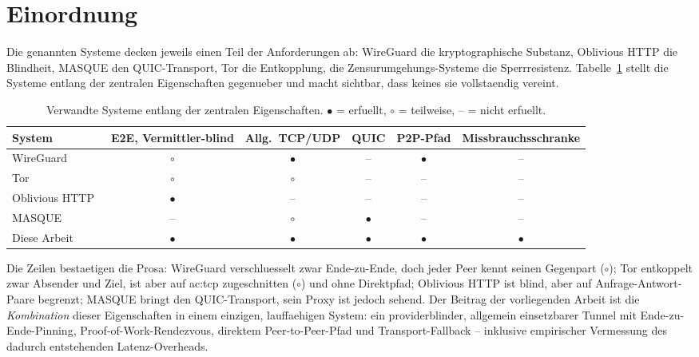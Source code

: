 \section{Einordnung}
\label{sec:rw-einordnung}

Die genannten Systeme decken jeweils einen Teil der Anforderungen ab:
WireGuard die kryptographische Substanz, Oblivious HTTP die Blindheit, MASQUE den
QUIC-Transport, Tor die Entkopplung, die Zensurumgehungs-Systeme die
Sperrresistenz. Tabelle~\ref{tab:rw-vergleich} stellt die Systeme entlang der
zentralen Eigenschaften gegenueber und macht sichtbar, dass keines sie
vollstaendig vereint.

\begin{table}[t]
  \centering
  \caption{Verwandte Systeme entlang der zentralen Eigenschaften.
  $\bullet$ = erfuellt, $\circ$ = teilweise, -- = nicht erfuellt.}
  \label{tab:rw-vergleich}
  \begin{tabular}{lccccc}
    \toprule
    System & E2E, Vermittler-blind & Allg.\ TCP/UDP & QUIC & P2P-Pfad & Missbrauchsschranke \\
    \midrule
    WireGuard~\cite{donenfeld2017wireguard} & $\circ$ & $\bullet$ & -- & $\bullet$ & -- \\
    Tor~\cite{dingledine2004tor} & $\circ$ & $\circ$ & -- & -- & -- \\
    Oblivious HTTP~\cite{rfc9458} & $\bullet$ & -- & -- & -- & -- \\
    MASQUE~\cite{rfc9298} & -- & $\circ$ & $\bullet$ & -- & -- \\
    Diese Arbeit & $\bullet$ & $\bullet$ & $\bullet$ & $\bullet$ & $\bullet$ \\
    \bottomrule
  \end{tabular}
\end{table}

Die Zeilen bestaetigen die Prosa: WireGuard verschluesselt zwar Ende-zu-Ende,
doch jeder Peer kennt seinen Gegenpart ($\circ$); Tor entkoppelt zwar Absender
und Ziel, ist aber auf \gls{ac:tcp} zugeschnitten ($\circ$) und ohne
Direktpfad; Oblivious HTTP ist blind, aber auf Anfrage-Antwort-Paare begrenzt;
MASQUE bringt den QUIC-Transport, sein Proxy ist jedoch sehend. Der Beitrag der
vorliegenden Arbeit ist die \emph{Kombination}
dieser Eigenschaften in einem einzigen, lauffaehigen System: ein providerblinder,
allgemein einsetzbarer Tunnel mit Ende-zu-Ende-Pinning, Proof-of-Work-Rendezvous,
direktem Peer-to-Peer-Pfad und Transport-Fallback -- inklusive empirischer
Vermessung des dadurch entstehenden Latenz-Overheads.
